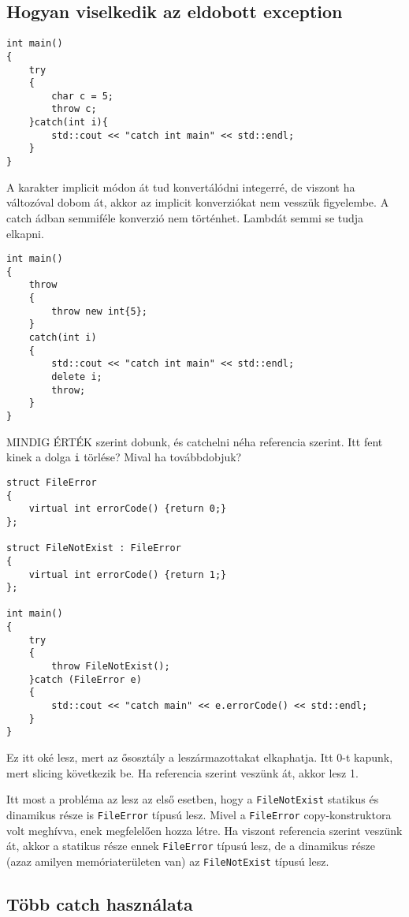 \documentclass[a4paper,11.5pt]{article}
\begin{document}
		\subsection{Hogyan viselkedik az eldobott exception}
		
		\begin{lstlisting}
int main()
{
	try
	{
		char c = 5;
		throw c;
	}catch(int i){
		std::cout << "catch int main" << std::endl;
	}
}
		\end{lstlisting}
		A karakter implicit módon át tud konvertálódni integerré, de viszont ha változóval dobom át, akkor az implicit konverziókat nem vesszük figyelembe. A catch ádban semmiféle konverzió nem történhet. Lambdát semmi se tudja elkapni.
		
		\begin{lstlisting}
int main()
{
	throw
	{
		throw new int{5};
	}
	catch(int i)
	{
		std::cout << "catch int main" << std::endl;
		delete i;
		throw;
	}
}
		\end{lstlisting}
		MINDIG ÉRTÉK szerint dobunk, és catchelni néha referencia szerint. Itt fent kinek a dolga \texttt{i} törlése? Mival ha továbbdobjuk?
		
		\begin{lstlisting}
struct FileError
{
	virtual int errorCode() {return 0;}
};

struct FileNotExist : FileError
{
	virtual int errorCode() {return 1;}
};

int main()
{
	try
	{
		throw FileNotExist();
	}catch (FileError e)
	{
		std::cout << "catch main" << e.errorCode() << std::endl;
	}
}
		\end{lstlisting}
		
		Ez itt oké lesz, mert az ősosztály a leszármazottakat elkaphatja. Itt 0-t kapunk, mert slicing következik be. Ha referencia szerint veszünk át, akkor lesz 1.
		
		Itt most a probléma az lesz az első esetben, hogy a \texttt{FileNotExist} statikus és dinamikus része is \texttt{FileError} típusú lesz. Mivel a \texttt{FileError} copy-konstruktora volt meghívva, enek megfelelően hozza létre. Ha viszont referencia szerint veszünk át, akkor a statikus része ennek \texttt{FileError} típusú lesz, de a dinamikus része (azaz amilyen memóriaterületen van) az \texttt{FileNotExist} típusú lesz. 
		
		\subsection{Több catch használata}
		
\end{document}
